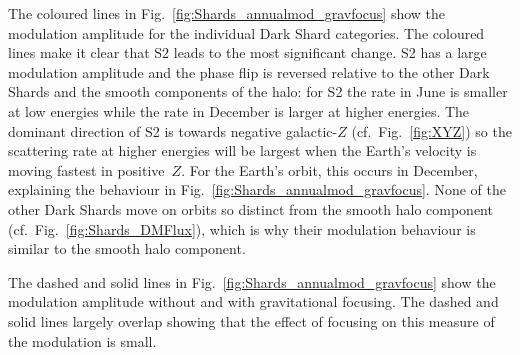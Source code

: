 \documentclass[prd,10pt,twocolumn,showpacs,nofootinbib,aps,superscriptaddress,preprintnumbers]{revtex4-1}
\begin{document}
  The coloured lines in Fig.~\ref{fig:Shards_annualmod_gravfocus} show
  the modulation amplitude for the individual Dark Shard categories. The coloured lines
  make it clear that S2 leads to the most significant change.
   S2 has a large modulation amplitude and
  the phase flip is reversed relative to the other Dark Shards and the
  smooth components of the halo: for S2 the rate in June is smaller at
  low energies while the rate in December is larger at higher energies.
  The dominant direction of S2 is towards negative galactic-$Z$
  (cf.\ Fig.~\ref{fig:XYZ}) so the scattering rate at higher energies
  will be largest when the Earth's velocity is moving fastest in
  positive~$Z$. For the Earth's orbit, this occurs in
  December, explaining the behaviour in
  Fig.~\ref{fig:Shards_annualmod_gravfocus}.  None of the other Dark
  Shards move on orbits so distinct from the smooth halo component
  (cf.\ Fig.~\ref{fig:Shards_DMFlux}), which is why their modulation
  behaviour is similar to the smooth halo component.

  The dashed and solid lines in
  Fig.~\ref{fig:Shards_annualmod_gravfocus} show the modulation
  amplitude without and with gravitational focusing. The dashed and
  solid lines largely overlap showing that the effect of focusing on
  this measure of the modulation is small.  
  
\end{document}
